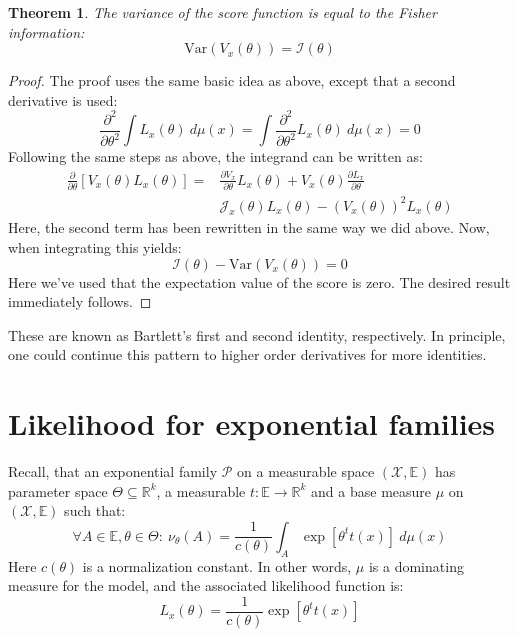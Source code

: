 \documentclass[12pt, a4paper]{article}
\newtheorem{theorem}{Theorem}[section]
\numberwithin{equation}{section}
\begin{document}
\begin{theorem}
The variance of the score function is equal to the Fisher information:
\begin{equation}
\textrm{Var}(V_x(\theta))=\mathcal{I}(\theta)
\end{equation}
\end{theorem}
\begin{proof}
The proof uses the same basic idea as above, except that a second derivative is used:
\begin{equation}
\frac{\partial^2}{\partial\theta^2}\int L_x(\theta)\ d\mu(x)=\int\frac{\partial^2}{\partial\theta^2}L_x(\theta)\ d\mu(x)=0
\end{equation}
Following the same steps as above, the integrand can be written as:
\begin{align}
\frac{\partial}{\partial\theta}\left[V_x(\theta)L_x(\theta)\right]=&\frac{\partial V_x}{\partial\theta}L_x(\theta)+V_x(\theta)\frac{\partial L_x}{\partial\theta} \\
&\mathcal{J}_x(\theta)L_x(\theta)-\left(V_x(\theta)\right)^2 L_x(\theta)
\end{align}
Here, the second term has been rewritten in the same way we did above. Now, when integrating this yields:
\begin{equation}
\mathcal{I}(\theta)-\textrm{Var}(V_x(\theta))=0
\end{equation}
Here we've used that the expectation value of the score is zero. The desired result immediately follows.
\end{proof}

These are known as Bartlett's first and second identity, respectively. In principle, one could continue this pattern to higher order derivatives for more identities.

\section{Likelihood for exponential families}
Recall, that an exponential family $\mathcal{P}$ on a measurable space $(\mathcal{X},\mathbb{E})$ has parameter space $\Theta\subseteq\mathbb{R}^k$, a measurable $t:\mathbb{E}\rightarrow\mathbb{R}^k$ and a base measure $\mu$ on $(\mathcal{X},\mathbb{E})$ such that:
\begin{equation}
\label{exponential_family}
\forall A\in\mathbb{E}, \theta\in\Theta:\ \nu_\theta(A)=\frac{1}{c(\theta)}\int_A\exp\left[\theta^t t(x)\right]\ d\mu(x)
\end{equation}
Here $c(\theta)$ is a normalization constant. In other words, $\mu$ is a dominating measure for the model, and the associated likelihood function is:
\begin{equation}
L_x(\theta)=\frac{1}{c(\theta)}\exp[\theta^t t(x)]
\end{equation}
\end{document}
